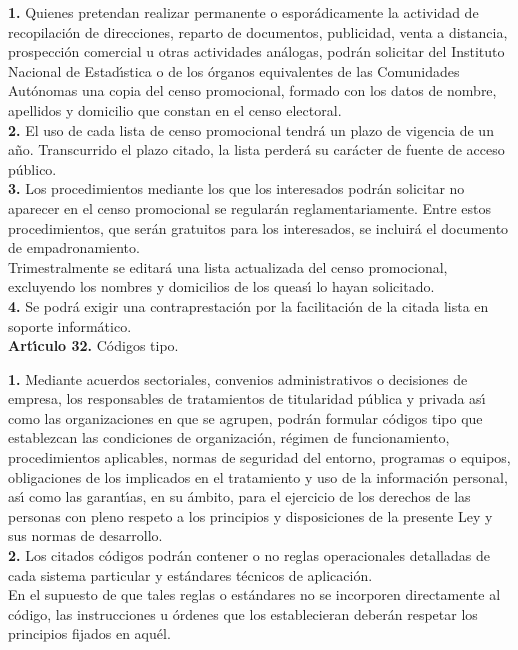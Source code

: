 {\bf 1.} Quienes pretendan realizar permanente o espor\'adicamente la actividad 
de recopilaci\'on de direcciones, reparto de documentos, publicidad, venta a 
distancia, prospecci\'on comercial u otras actividades an\'alogas, podr\'an 
solicitar del Instituto Nacional de Estad\'{\i}stica o de los \'organos 
equivalentes de las Comunidades Aut\'onomas una copia del censo promocional,
formado con los datos de nombre, apellidos y domicilio que constan en el censo 
electoral.\\

{\bf 2.} El uso de cada lista de censo promocional tendr\'a un plazo de 
vigencia de un a\~no. Transcurrido el plazo citado, la lista perder\'a su 
car\'acter de fuente de acceso p\'ublico.\\

{\bf 3.} Los procedimientos mediante los que los interesados podr\'an solicitar 
no aparecer en el censo promocional se regular\'an reglamentariamente. Entre 
estos procedimientos, que ser\'an gratuitos para los interesados, se incluir\'a 
el documento de empadronamiento.\\
Trimestralmente se editar\'a una lista actualizada del censo promocional,
excluyendo los nombres y domicilios de los queas\'{\i} lo hayan solicitado.\\

{\bf 4.} Se podr\'a exigir una contraprestaci\'on por la facilitaci\'on de la 
citada lista en soporte inform\'atico.
\vspace{0.3cm}\\
{\large {\bf Art\'{\i}culo 32.} C\'odigos tipo.}

{\bf 1.} Mediante acuerdos sectoriales, convenios administrativos o decisiones 
de empresa, los responsables de tratamientos de titularidad p\'ublica y privada 
as\'{\i} como las organizaciones en que se agrupen, podr\'an formular c\'odigos 
tipo que establezcan las condiciones de organizaci\'on, r\'egimen de 
funcionamiento, procedimientos aplicables, normas de seguridad del entorno, 
programas o equipos, obligaciones de los implicados en el tratamiento y uso de 
la informaci\'on personal, as\'{\i} como las garant\'{\i}as, en su \'ambito, 
para el ejercicio de los derechos de las personas con pleno respeto a los 
principios y disposiciones de la presente Ley y sus normas de desarrollo.\\

{\bf 2.} Los citados c\'odigos podr\'an contener o no reglas operacionales 
detalladas de cada sistema particular y est\'andares t\'ecnicos de 
aplicaci\'on.\\
En el supuesto de que tales reglas o est\'andares no se incorporen directamente 
al c\'odigo, las instrucciones u \'ordenes que los establecieran deber\'an 
respetar los principios fijados en aqu\'el.\\

